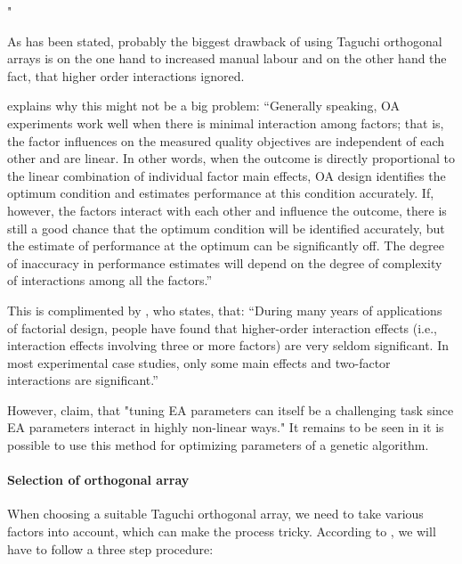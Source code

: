 "\cite{mills_determining_2015}





As has been stated, probably the biggest drawback of using Taguchi orthogonal arrays is on the one hand to increased manual labour and on the other hand the fact, that higher order interactions ignored.

\cite{roy_primer_1990} explains why this might not be a big problem:
\enquote{Generally speaking, OA experiments work well when there is minimal interaction among factors; that is, the factor influences on the measured quality objectives are independent of each other and are linear. In other words, when the outcome is directly proportional to the linear combination of individual factor main effects, OA design identifies the optimum condition and estimates performance at this condition accurately. If, however, the factors interact with each other and influence the outcome, there is still a good chance that the optimum condition will be identified accurately, but the estimate of performance at the optimum can be significantly off. The degree of inaccuracy in performance estimates will depend on the degree of complexity of interactions among all the factors.}

This is complimented by \cite{yang_design_2009}, who states, that:
\enquote{During many years of applications of factorial design, people have found that higher-order interaction effects (i.e., interaction effects involving three or more factors) are very seldom significant. In most experimental case studies, only some main effects and two-factor interactions are significant.}


However, \cite{kacprzyk_parameter_2007} claim, that "tuning EA parameters can itself be a challenging task since EA parameters interact in highly non-linear ways." It remains to be seen in it is possible to use this method for optimizing parameters of a genetic algorithm.

\paragraph{Selection of orthogonal array}
When choosing a suitable Taguchi orthogonal array, we need to take various factors into account, which can make the process tricky. According to \cite{yang_design_2009}, we will have to follow a three step procedure:

